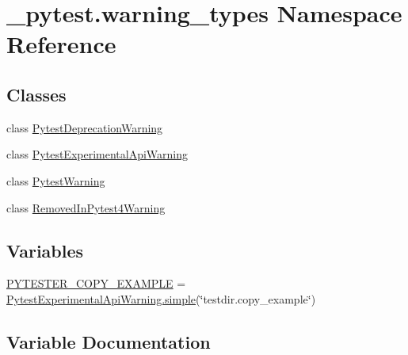 \hypertarget{namespace__pytest_1_1warning__types}{}\section{\+\_\+pytest.\+warning\+\_\+types Namespace Reference}
\label{namespace__pytest_1_1warning__types}
\subsection*{Classes}
\begin{DoxyCompactItemize}
\item 
class \hyperlink{class__pytest_1_1warning__types_1_1_pytest_deprecation_warning}{Pytest\+Deprecation\+Warning}
\item 
class \hyperlink{class__pytest_1_1warning__types_1_1_pytest_experimental_api_warning}{Pytest\+Experimental\+Api\+Warning}
\item 
class \hyperlink{class__pytest_1_1warning__types_1_1_pytest_warning}{Pytest\+Warning}
\item 
class \hyperlink{class__pytest_1_1warning__types_1_1_removed_in_pytest4_warning}{Removed\+In\+Pytest4\+Warning}
\end{DoxyCompactItemize}
\subsection*{Variables}
\begin{DoxyCompactItemize}
\item 
\hyperlink{namespace__pytest_1_1warning__types_af5469e2289f902a9fe66e1756b882261}{P\+Y\+T\+E\+S\+T\+E\+R\+\_\+\+C\+O\+P\+Y\+\_\+\+E\+X\+A\+M\+P\+LE} = \hyperlink{class__pytest_1_1warning__types_1_1_pytest_experimental_api_warning_a513876a6d9cef7cb5af82899777db432}{Pytest\+Experimental\+Api\+Warning.\+simple}(\char`\"{}testdir.\+copy\+\_\+example\char`\"{})
\end{DoxyCompactItemize}


\subsection{Variable Documentation}
\mbox{\label{namespace__pytest_1_1warning__types_af5469e2289f902a9fe66e1756b882261}} 
